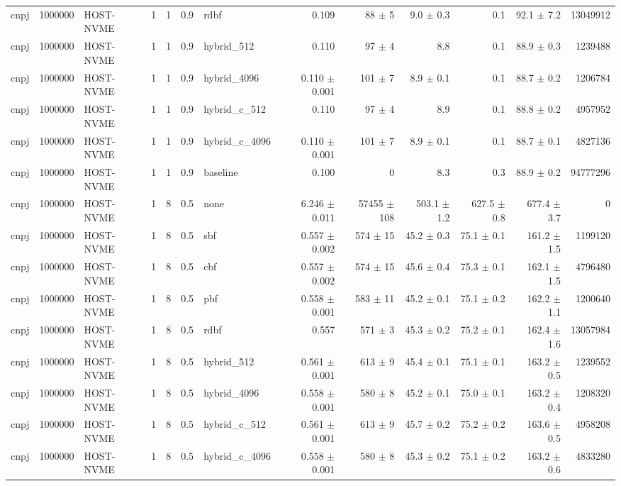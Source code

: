 \begin{tabular}{lllllllrrrrrr}
cnpj & 1000000 & HOST-NVME & 1 & 1 & 0.9 & rdbf & 0.109 & 88 $\pm$ 5 & 9.0 $\pm$ 0.3 & 0.1 & 92.1 $\pm$ 7.2 & 13049912 \\
cnpj & 1000000 & HOST-NVME & 1 & 1 & 0.9 & hybrid\_512 & 0.110 & 97 $\pm$ 4 & 8.8 & 0.1 & 88.9 $\pm$ 0.3 & 1239488 \\
cnpj & 1000000 & HOST-NVME & 1 & 1 & 0.9 & hybrid\_4096 & 0.110 $\pm$ 0.001 & 101 $\pm$ 7 & 8.9 $\pm$ 0.1 & 0.1 & 88.7 $\pm$ 0.2 & 1206784 \\
cnpj & 1000000 & HOST-NVME & 1 & 1 & 0.9 & hybrid\_c\_512 & 0.110 & 97 $\pm$ 4 & 8.9 & 0.1 & 88.8 $\pm$ 0.2 & 4957952 \\
cnpj & 1000000 & HOST-NVME & 1 & 1 & 0.9 & hybrid\_c\_4096 & 0.110 $\pm$ 0.001 & 101 $\pm$ 7 & 8.9 $\pm$ 0.1 & 0.1 & 88.7 $\pm$ 0.1 & 4827136 \\
cnpj & 1000000 & HOST-NVME & 1 & 1 & 0.9 & baseline & 0.100 & 0 & 8.3 & 0.3 & 88.9 $\pm$ 0.2 & 94777296 \\
cnpj & 1000000 & HOST-NVME & 1 & 8 & 0.5 & none & 6.246 $\pm$ 0.011 & 57455 $\pm$ 108 & 503.1 $\pm$ 1.2 & 627.5 $\pm$ 0.8 & 677.4 $\pm$ 3.7 & 0 \\
cnpj & 1000000 & HOST-NVME & 1 & 8 & 0.5 & sbf & 0.557 $\pm$ 0.002 & 574 $\pm$ 15 & 45.2 $\pm$ 0.3 & 75.1 $\pm$ 0.1 & 161.2 $\pm$ 1.5 & 1199120 \\
cnpj & 1000000 & HOST-NVME & 1 & 8 & 0.5 & cbf & 0.557 $\pm$ 0.002 & 574 $\pm$ 15 & 45.6 $\pm$ 0.4 & 75.3 $\pm$ 0.1 & 162.1 $\pm$ 1.5 & 4796480 \\
cnpj & 1000000 & HOST-NVME & 1 & 8 & 0.5 & pbf & 0.558 $\pm$ 0.001 & 583 $\pm$ 11 & 45.2 $\pm$ 0.1 & 75.1 $\pm$ 0.2 & 162.2 $\pm$ 1.1 & 1200640 \\
cnpj & 1000000 & HOST-NVME & 1 & 8 & 0.5 & rdbf & 0.557 & 571 $\pm$ 3 & 45.3 $\pm$ 0.2 & 75.2 $\pm$ 0.1 & 162.4 $\pm$ 1.6 & 13057984 \\
cnpj & 1000000 & HOST-NVME & 1 & 8 & 0.5 & hybrid\_512 & 0.561 $\pm$ 0.001 & 613 $\pm$ 9 & 45.4 $\pm$ 0.1 & 75.1 $\pm$ 0.1 & 163.2 $\pm$ 0.5 & 1239552 \\
cnpj & 1000000 & HOST-NVME & 1 & 8 & 0.5 & hybrid\_4096 & 0.558 $\pm$ 0.001 & 580 $\pm$ 8 & 45.2 $\pm$ 0.1 & 75.0 $\pm$ 0.1 & 163.2 $\pm$ 0.4 & 1208320 \\
cnpj & 1000000 & HOST-NVME & 1 & 8 & 0.5 & hybrid\_c\_512 & 0.561 $\pm$ 0.001 & 613 $\pm$ 9 & 45.7 $\pm$ 0.2 & 75.2 $\pm$ 0.2 & 163.6 $\pm$ 0.5 & 4958208 \\
cnpj & 1000000 & HOST-NVME & 1 & 8 & 0.5 & hybrid\_c\_4096 & 0.558 $\pm$ 0.001 & 580 $\pm$ 8 & 45.3 $\pm$ 0.2 & 75.1 $\pm$ 0.2 & 163.2 $\pm$ 0.6 & 4833280 \\

\end{tabular}
